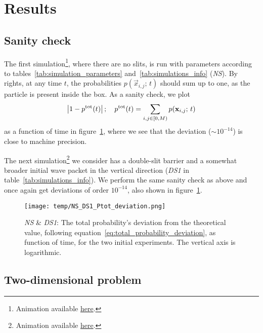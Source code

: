 \section{Results}\label{sec:results}





\subsection{Sanity check}\label{sec:results:sanity}

    The first simulation\footnote{Animation available \href{\animlink/NS_anim.mp4}{here}.}, where there are no slits, is run with parameters according to tables~\ref{tab:simulation_parameters} and~\ref{tab:simulations_info} (\textit{NS}). By rights, at any time $t$, the probabilities $p(\vec{x}_{i,j}; \, t)$ should sum up to one, as the particle is present inside the box. As a sanity check, we plot 
    \begin{equation}\label{eq:total_probability_deviation}
        \abs{1- p^\mathrm{tot}(t)}\,; \quad p^\mathrm{tot}(t) = \sum_{i,j\in [0, M)} p(\mathbf{x}_{i,j};\, t)
    \end{equation}
    as a function of time in figure~\ref{fig:ptot_deviation_NS_DS1}, where we see that the deviation ($\sim 10^{-14}$) is close to machine precision.

    The next simulation\footnote{Animation available \href{\animlink/DS1_anim.mp4}{here}.} we consider has a double-slit barrier and a somewhat broader initial wave packet in the vertical direction (\textit{DS1} in table~\ref{tab:simulations_info}). We perform the same sanity check as above and once again get deviations of order $ 10^{-14}$, also shown in figure~\ref{fig:ptot_deviation_NS_DS1}.

    \begin{figure}[ht!]
        \centering
        \texttt{[image: temp/NS\_DS1\_Ptot\_deviation.png]}
        \caption{\textit{NS} \& \textit{DS1}: The total probability's deviation from the theoretical value, following equation~\eqref{eq:total_probability_deviation}, as function of time, for the two initial experiments. The vertical axis is logarithmic.}
        \label{fig:ptot_deviation_NS_DS1}
    \end{figure}


\subsection{Two-dimensional problem}
    

